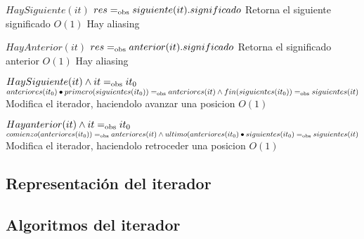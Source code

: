  {$HaySiguiente(it)$}
 {$res =_{\mathrm{obs}} siguiente(it).significado$}
 {Retorna el siguiente significado}
 {$O(1)$}
 {Hay aliasing}

 {$HayAnterior(it)$}
 {$res =_{\mathrm{obs}} anterior(it).significado$}
 {Retorna el significado anterior}
 {$O(1)$}
 {Hay aliasing}

 {$HaySiguiente(it) \land it =_{\mathrm{obs}} it_0$}
 {$anteriores(it_0) \bullet primero(siguientes(it_0)) =_{\mathrm{obs}} anteriores(it) \land fin(siguientes(it_0)) =_{\mathrm{obs}} siguientes(it)$}
 {Modifica el iterador, haciendolo avanzar una posicion}
 {$O(1)$}
 {}

 {$Hay anterior(it) \land it =_{\mathrm{obs}} it_0$}
 {$comienzo(anteriores(it_0)) =_{\mathrm{obs}} anteriores(it) \land ultimo(anteriores(it_0) \bullet siguientes(it_0) =_{\mathrm{obs}} siguientes(it)$}
 {Modifica el iterador, haciendolo retroceder una posicion}
 {$O(1)$}
 {}

\subsection{Representación del iterador}



\subsection{Algoritmos del iterador}







